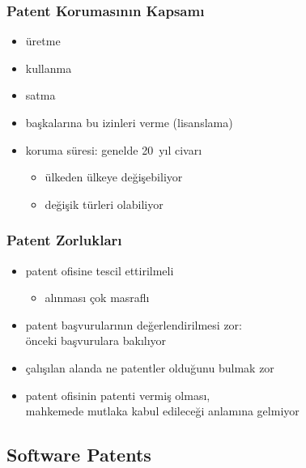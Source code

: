 \documentclass[dvipsnames]{beamer}
\theoremstyle{definition}
\theoremstyle{example}
\theoremstyle{plain}
\begin{document}
\begin{frame}
  \frametitle{Patent Korumasının Kapsamı}

  \begin{itemize}
    \item üretme
    \item kullanma
    \item satma
    \item başkalarına bu izinleri verme (lisanslama)

    \pause
    \medskip
    \item koruma süresi: genelde 20~yıl civarı
    \begin{itemize}
      \item ülkeden ülkeye değişebiliyor
      \item değişik türleri olabiliyor
    \end{itemize}
  \end{itemize}
\end{frame}

\begin{frame}
  \frametitle{Patent Zorlukları}

  \begin{itemize}
    \item patent ofisine tescil ettirilmeli
    \begin{itemize}
      \item alınması çok masraflı
    \end{itemize}

    \pause
    \medskip
    \item patent başvurularının değerlendirilmesi zor:\\
      önceki başvurulara bakılıyor

    \pause
    \medskip
    \item çalışılan alanda ne patentler olduğunu bulmak zor

    \pause
    \medskip
    \item patent ofisinin patenti vermiş olması,\\
      mahkemede mutlaka kabul edileceği anlamına gelmiyor
  \end{itemize}
\end{frame}

\subsection{Software Patents}
\end{document}
